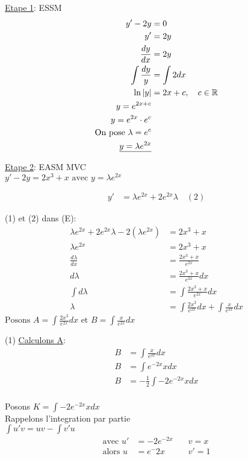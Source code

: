 \underline{Etape 1}: ESSM
\begin{align*}
	y' - 2y &= 0 \\
	y' &= 2y \\
	\frac{dy}{dx} &= 2y \\
	\int \frac{dy}{y} &= \int 2dx \\
	\ln |y| &= 2x+ c, \quad c \in \mathbb{R} \\
	y = e^{2x+c} \\
	y = e^{2x} \cdot e^c \\
	\text{On pose } \lambda = e^c \\
	\text{\underline{$y = \lambda e^{2x}$}}
\end{align*}

\underline{Etape 2}: EASM MVC \\

$y' - 2y = 2x^3 + x \text{ avec } y = \lambda e^{2x}$

\begin{align*}
	y' &= \lambda e^{2x} + 2e^{2x}\lambda \quad (2)
\end{align*}

(1) et (2) dans (E):
\begin{align*}
	\lambda e^{2x} + 2e^{2x}\lambda - 2(\lambda e^{2x}) &= 2x^3 + x \\
	\lambda e^{2x} &= 2x^3 + x \\
	\frac{d\lambda}{dx} &= \frac{2x^3 + x}{e^{2x}} \\
	d\lambda &= \frac{2x^3 + x}{e^{2x}} dx \\
	\int d\lambda &= \int \frac{2x^3 +x}{e^{2x}} dx \\
	\lambda &= \int \frac{2x^3}{e^{2x}} dx + \int \frac{x}{e^{2x}} dx
\end{align*}
$\text{Posons } A = \int \frac{2x^3}{e^{2x}} dx \text{ et } B = \int \frac{x}{e^{2x}} dx$

(1) \underline{Calculons A}:
\begin{align*}
	B &= \int \frac{x}{e^{2x}} dx \\
	B &= \int e^{-2x} x dx \\
	B &= -\frac{1}{2}\int -2e^{-2x} x dx \\
\end{align*}

Posons $K = \int -2e^{-2x} x dx$ \\
Rappelons l'integration par partie \\
$\int u'v = uv - \int v'u$ \\

\begin{align*}
	\text{avec } u' &= -2e^{-2x} \quad &v= x \\
	\text{alors } u &= e^-{2x} \quad &v'= 1
\end{align*}

